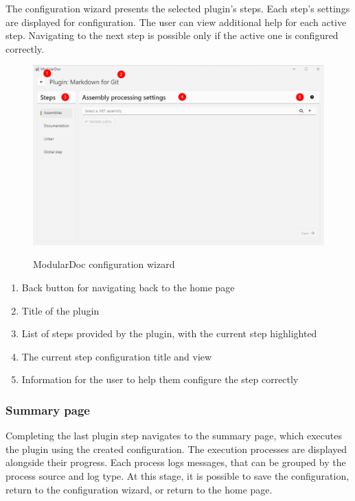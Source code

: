 The configuration wizard presents the selected plugin's steps. Each step's settings are displayed for configuration. The user can view additional help for each active step. Navigating to the next step is possible only if the active one is configured correctly.

\begin{figure}[H]
    \includegraphics[width=\linewidth]{img/modularDocConfigurator.png}
    \label{fig:modularDocconfiguratorPage}
    \caption{ModularDoc configuration wizard}
\end{figure}

\begin{enumerate}
    \item Back button for navigating back to the home page
    \item Title of the plugin
    \item List of steps provided by the plugin, with the current step highlighted
    \item The current step configuration title and view
    \item Information for the user to help them configure the step correctly
\end{enumerate}

\pagebreak
\subsubsection{Summary page}

Completing the last plugin step navigates to the summary page, which executes the plugin using the created configuration. The execution processes are displayed alongside their progress. Each process logs messages, that can be grouped by the process source and log type. At this stage, it is possible to save the configuration, return to the configuration wizard, or return to the home page.

